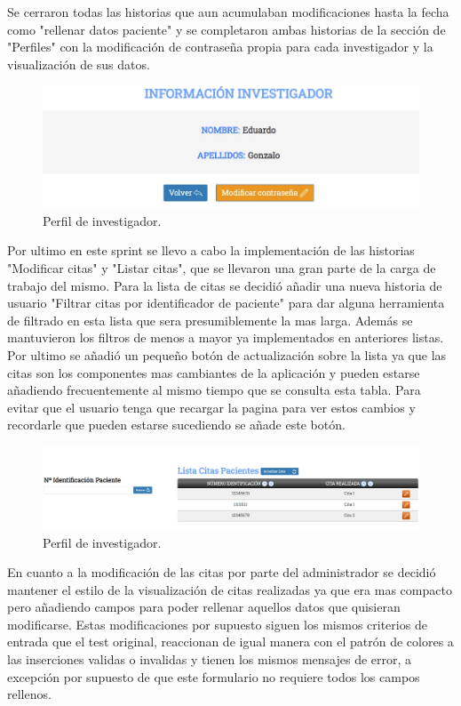 Se cerraron todas las historias que aun acumulaban modificaciones hasta la fecha como "rellenar datos paciente" y se completaron ambas historias de la sección de "Perfiles" con la modificación de contraseña propia para cada investigador y la visualización de sus datos.

\begin{figure}[h]
    \centering
     \includegraphics[width=14.cm,height=4.cm]{images/perfil.jpg}
    \caption{Perfil de investigador.}
\end{figure}
\newpage

Por ultimo en este sprint se llevo a cabo la implementación de las historias "Modificar citas" y "Listar citas", que se llevaron una gran parte de la carga de trabajo del mismo. Para la lista de citas se decidió añadir una nueva historia de usuario "Filtrar citas por identificador de paciente" para dar alguna herramienta de filtrado en esta lista que sera presumiblemente la mas larga. Además se mantuvieron los filtros de menos a mayor ya implementados en anteriores listas. Por ultimo se añadió un pequeño botón de actualización sobre la lista ya que las citas son los componentes mas cambiantes de la aplicación y pueden estarse añadiendo frecuentemente al mismo tiempo que se consulta esta tabla. Para evitar que el usuario tenga que recargar la pagina para ver estos cambios y recordarle que pueden estarse sucediendo se añade este botón.

\begin{figure}[h]
    \centering
     \includegraphics[width=1\textwidth]{images/listarCitas.jpg}
    \caption{Perfil de investigador.}
\end{figure}

En cuanto a la modificación de las citas por parte del administrador se decidió mantener el estilo de la visualización de citas realizadas ya que era mas compacto pero añadiendo campos para poder rellenar aquellos datos que quisieran modificarse. Estas modificaciones por supuesto siguen los mismos criterios de entrada que el test original, reaccionan de igual manera con el patrón de colores a las inserciones validas o invalidas y tienen los mismos mensajes de error, a excepción por supuesto de que este formulario no requiere todos los campos rellenos.

